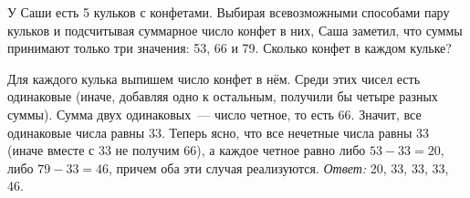\problem
{}
У Саши есть 5 кульков с конфетами.
Выбирая всевозможными способами пару кульков и подсчитывая суммарное число
конфет в них, Саша заметил, что суммы принимают только три значения:
53, 66 и 79.
Сколько конфет в каждом кульке?

\solution
Для каждого кулька выпишем число конфет в нём.
Среди этих чисел есть одинаковые
(иначе, добавляя одно к остальным, получили бы четыре разных суммы).
Сумма двух одинаковых~--- число четное, то есть 66.
Значит, все одинаковые числа равны 33.
Теперь ясно, что все нечетные числа равны 33
(иначе вместе с 33 не получим 66), а каждое четное равно
либо $53 - 33 = 20$, либо $79 - 33 = 46$, причем оба эти случая реализуются.
\emph{Ответ:} 20, 33, 33, 33, 46.

\endproblem
